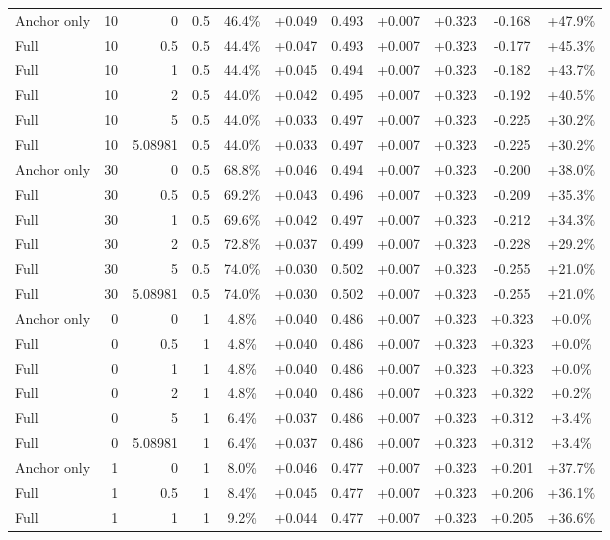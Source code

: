 \begin{table}[htbp]
\begin{tabular}{lrrrccccccc}
Anchor only & 10 & 0 & 0.5 & 46.4\% & +0.049 & 0.493 & +0.007 & +0.323 & -0.168 & +47.9\% \\
Full & 10 & 0.5 & 0.5 & 44.4\% & +0.047 & 0.493 & +0.007 & +0.323 & -0.177 & +45.3\% \\
Full & 10 & 1 & 0.5 & 44.4\% & +0.045 & 0.494 & +0.007 & +0.323 & -0.182 & +43.7\% \\
Full & 10 & 2 & 0.5 & 44.0\% & +0.042 & 0.495 & +0.007 & +0.323 & -0.192 & +40.5\% \\
Full & 10 & 5 & 0.5 & 44.0\% & +0.033 & 0.497 & +0.007 & +0.323 & -0.225 & +30.2\% \\
Full & 10 & 5.08981 & 0.5 & 44.0\% & +0.033 & 0.497 & +0.007 & +0.323 & -0.225 & +30.2\% \\
Anchor only & 30 & 0 & 0.5 & 68.8\% & +0.046 & 0.494 & +0.007 & +0.323 & -0.200 & +38.0\% \\
Full & 30 & 0.5 & 0.5 & 69.2\% & +0.043 & 0.496 & +0.007 & +0.323 & -0.209 & +35.3\% \\
Full & 30 & 1 & 0.5 & 69.6\% & +0.042 & 0.497 & +0.007 & +0.323 & -0.212 & +34.3\% \\
Full & 30 & 2 & 0.5 & 72.8\% & +0.037 & 0.499 & +0.007 & +0.323 & -0.228 & +29.2\% \\
Full & 30 & 5 & 0.5 & 74.0\% & +0.030 & 0.502 & +0.007 & +0.323 & -0.255 & +21.0\% \\
Full & 30 & 5.08981 & 0.5 & 74.0\% & +0.030 & 0.502 & +0.007 & +0.323 & -0.255 & +21.0\% \\
Anchor only & 0 & 0 & 1 & 4.8\% & +0.040 & 0.486 & +0.007 & +0.323 & +0.323 & +0.0\% \\
Full & 0 & 0.5 & 1 & 4.8\% & +0.040 & 0.486 & +0.007 & +0.323 & +0.323 & +0.0\% \\
Full & 0 & 1 & 1 & 4.8\% & +0.040 & 0.486 & +0.007 & +0.323 & +0.323 & +0.0\% \\
Full & 0 & 2 & 1 & 4.8\% & +0.040 & 0.486 & +0.007 & +0.323 & +0.322 & +0.2\% \\
Full & 0 & 5 & 1 & 6.4\% & +0.037 & 0.486 & +0.007 & +0.323 & +0.312 & +3.4\% \\
Full & 0 & 5.08981 & 1 & 6.4\% & +0.037 & 0.486 & +0.007 & +0.323 & +0.312 & +3.4\% \\
Anchor only & 1 & 0 & 1 & 8.0\% & +0.046 & 0.477 & +0.007 & +0.323 & +0.201 & +37.7\% \\
Full & 1 & 0.5 & 1 & 8.4\% & +0.045 & 0.477 & +0.007 & +0.323 & +0.206 & +36.1\% \\
Full & 1 & 1 & 1 & 9.2\% & +0.044 & 0.477 & +0.007 & +0.323 & +0.205 & +36.6\% \\

\end{tabular}
\end{table}
